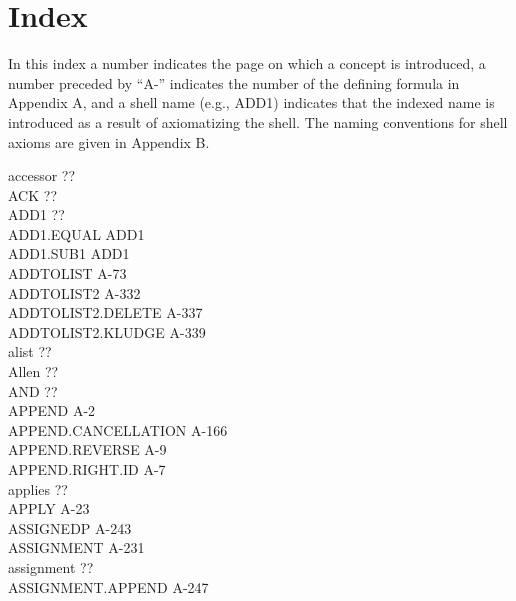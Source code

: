 \documentclass[10pt]{book}
\newenvironment{pubasis}{\begin{flushleft}}{\end{flushleft}}
\begin{document}
\backmatter
\chapter{Index}
\pagestyle{headings}
\label{APPINDEX}
In this index a number indicates the page on which a concept
is introduced, a number preceded by ``A-'' indicates the
number of the defining formula in Appendix A, and a shell
name (e.g., ADD1) indicates that the indexed name is
introduced as a result of axiomatizing the shell.  The
naming conventions for shell axioms are given in Appendix B.

\begin{pubasis}
accessor                                     ??\\
ACK                                          ??\\
ADD1                                         ??\\
ADD1.EQUAL                                   ADD1\\
ADD1.SUB1                                    ADD1\\
ADDTOLIST                                    A-73\\
ADDTOLIST2                                   A-332\\
ADDTOLIST2.DELETE                            A-337\\
ADDTOLIST2.KLUDGE                            A-339\\
alist                                        ??\\
Allen                                        ??\\
AND                                          ??\\
APPEND                                       A-2\\
APPEND.CANCELLATION                          A-166\\
APPEND.REVERSE                               A-9\\
APPEND.RIGHT.ID                              A-7\\
applies                                      ??\\
APPLY                                        A-23\\
ASSIGNEDP                                    A-243\\
ASSIGNMENT                                   A-231\\
assignment                                   ??\\
ASSIGNMENT.APPEND                            A-247\\

\end{pubasis}
\end{document}

